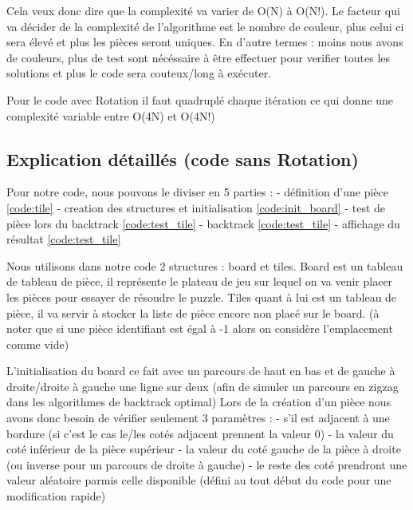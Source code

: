 \documentclass[french]{rapport}
\begin{document}
Cela veux donc dire que la complexité va varier de O(N) à O(N!).
Le facteur qui va décider de la complexité de l'algorithme est le nombre de couleur, plus celui ci sera élevé et plus les pièces seront uniques.
En d'autre termes : moins nous avons de couleurs, plus de test sont nécéssaire à être effectuer pour verifier toutes les solutions et plus le code sera couteux/long à exécuter.

Pour le code avec Rotation il faut quadruplé chaque itération ce qui donne une complexité variable entre O(4N) et O(4N!)

\subsection{Explication détaillés (code sans Rotation)}

Pour notre code, nous pouvons le diviser en 5 parties : 
- définition d'une pièce \ref{code:tile}
- creation des structures et initialisation \ref{code:init_board} 
- test de pièce lors du backtrack \ref{code:test_tile} 
- backtrack \ref{code:test_tile} 
- affichage du résultat \ref{code:test_tile} 

 

Nous utilisons dans notre code 2 structures : board et tiles.
Board est un tableau de tableau de pièce, il représente le plateau de jeu sur lequel on va venir placer les pièces pour essayer de résoudre le puzzle. 
Tiles quant à lui est un tableau de pièce, il va servir à stocker la liste de pièce encore non placé sur le board.
(à noter que si une pièce identifiant est égal à -1 alors on considère l'emplacement comme vide)

L'initialisation du board ce fait avec un parcours de haut en bas et de gauche à droite/droite à gauche une ligne sur deux (afin de simuler un parcours en zigzag dans les algorithmes de backtrack optimal)
Lors de la création d'un pièce nous avons donc besoin de vérifier seulement 3 paramètres : 
- s'il est adjacent à une bordure (si c'est le cas le/les cotés adjacent prennent la valeur 0)
- la valeur du coté inférieur de la pièce supérieur
- la valeur du coté gauche de la pièce à droite (ou inverse pour un parcours de droite à gauche)
- le reste des coté prendront une valeur aléatoire parmis celle disponible (défini au tout début du code pour une modification rapide)
 
\end{document}
